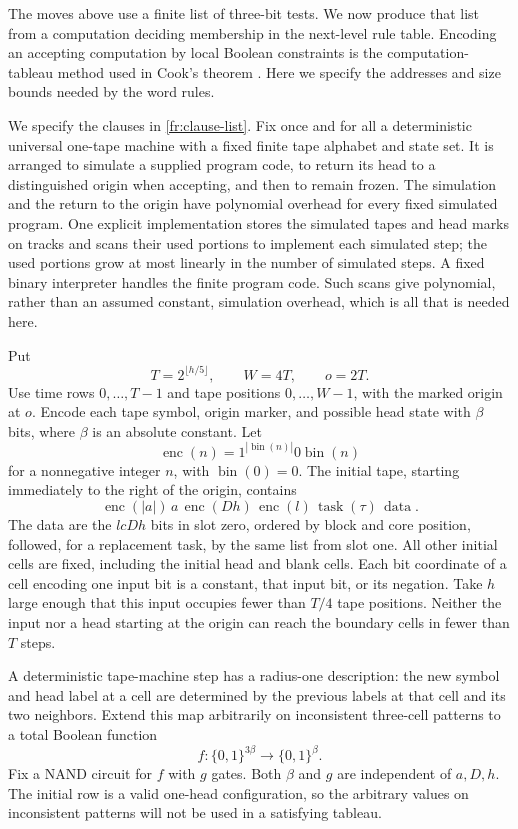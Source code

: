 The moves above use a finite list of three-bit tests. We now produce
that list from a computation deciding membership in the next-level
rule table. Encoding an accepting computation by local Boolean
constraints is the computation-tableau method used in Cook's theorem
\cite[proof of Theorem~1]{Cook1971}. Here we specify the addresses and size bounds
needed by the word rules.

We specify the clauses in \eqref{fr:clause-list}.  Fix once and for
all a deterministic universal one-tape machine with a fixed finite
tape alphabet and state set.  It is arranged to simulate a supplied
program code, to return its head to a distinguished origin when
accepting, and then to remain frozen.  The simulation and the return
to the origin have polynomial overhead for every fixed simulated
program.  One explicit implementation stores the simulated tapes
and head marks on tracks and scans their used portions to implement
each simulated step; the used portions grow at most linearly in
the number of simulated steps.  A fixed binary interpreter handles
the finite program code.  Such scans give polynomial, rather than
an assumed constant, simulation overhead, which is all that is
needed here.

Put
\[
 T=2^{\lfloor h/5\rfloor},\qquad W=4T,\qquad o=2T.
\]
Use time rows $0,\ldots,T-1$ and tape positions $0,\ldots,W-1$,
with the marked origin at $o$.  Encode each tape symbol, origin
marker, and possible head state with $\beta$ bits, where $\beta$ is
an absolute constant.  Let
\[
 \operatorname{enc}(n)=1^{|\operatorname{bin}(n)|}
                 0\operatorname{bin}(n)
\]
for a nonnegative integer $n$, with $\operatorname{bin}(0)=0$.
The initial tape, starting immediately to the right of the
origin, contains
\[
 \operatorname{enc}(|a|)\,a\,
 \operatorname{enc}(Dh)\,\operatorname{enc}(l)\,
 \operatorname{task}(\tau)\,\operatorname{data}.
\]
The data are the $lcDh$ bits in slot zero, ordered by block and
core position, followed, for a replacement task, by the same list
from slot one.  All other initial cells are fixed, including the
initial head and blank cells.  Each bit coordinate of a cell
encoding one input bit is a constant, that input bit, or its
negation.  Take $h$ large enough that this input occupies fewer
than $T/4$ tape positions.  Neither the input nor a head starting
at the origin can reach the boundary cells in fewer than $T$
steps.

A deterministic tape-machine step has a radius-one description:
the new symbol and head label at a cell are determined by the
previous labels at that cell and its two neighbors.  Extend this
map arbitrarily on inconsistent three-cell patterns to a total
Boolean function
\[
 f:\{0,1\}^{3\beta}\longrightarrow\{0,1\}^{\beta}.
\]
Fix a NAND circuit for $f$ with $g$ gates.  Both $\beta$ and $g$
are independent of $a,D,h$.  The initial row is a valid one-head
configuration, so the arbitrary values on inconsistent patterns
will not be used in a satisfying tableau.

